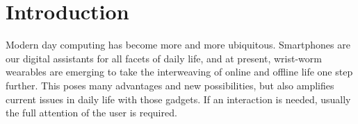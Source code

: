 \chapter{Introduction}

Modern day computing has become more and more ubiquitous. Smartphones are our digital assistants for all facets of daily life, and at present, wrist-worm wearables are emerging to take the interweaving of online and offline life one step further. This poses many advantages and new possibilities, but also amplifies current issues in daily life with those gadgets. If an interaction is needed, usually the full attention of the user is required.